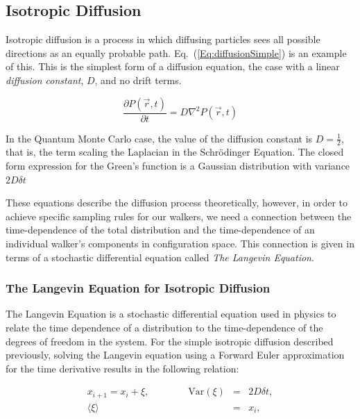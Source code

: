 \subsection{Isotropic Diffusion}

Isotropic diffusion is a process in which diffusing particles sees all possible directions as an equally probable path. Eq.~(\ref{Eq:diffusionSimple}) is an example of this. This is the simplest form of a diffusion equation, the case with a linear \textit{diffusion constant}, $D$, and no drift terms.

\begin{equation}
 \label{Eq:diffusionSimple}
 \frac{\partial P(\vec r, t)}{\partial t} = D\nabla^2 P(\vec r, t) 
\end{equation}

In the Quantum Monte Carlo case, the value of the diffusion constant is $D=\frac{1}{2}$, that is, the term scaling the Laplacian in the Schrödinger Equation. The closed form expression for the Green's function is a Gaussian distribution with variance $2D\delta t$ \cite{abInitioMC}



These equations describe the diffusion process theoretically, however, in order to achieve specific sampling rules for our walkers, we need a connection between the time-dependence of the total distribution and the time-dependence of an individual walker's components in configuration space. This connection is given in terms of a stochastic differential equation called \textit{The Langevin Equation}.

\subsubsection{The Langevin Equation for Isotropic Diffusion}

The Langevin Equation is a stochastic differential equation used in physics to relate the time dependence of a distribution to the time-dependence of the degrees of freedom in the system. For the simple isotropic diffusion described previously, solving the Langevin equation using a Forward Euler approximation for the time derivative results in the following relation:

\begin{eqnarray}
\label{eq:langevinSolSimple}
 x_{i+1} = x_i + \xi, \qquad\qquad \mathrm{Var}(\xi) &=& 2D\delta t, \\
			     \langle\xi\rangle &=& x_i, \nonumber 
\end{eqnarray}

